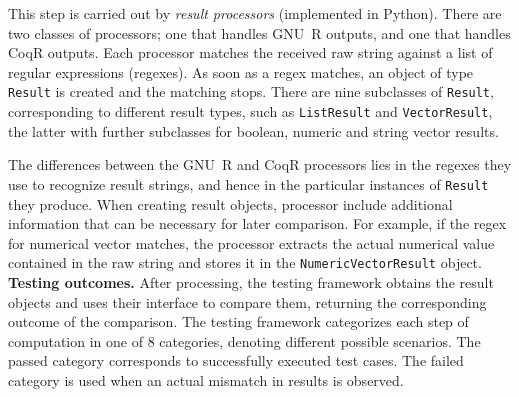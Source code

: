 \documentclass[
    sigplan,
    10pt,
    review, %
    natbib=false %
 ]{acmart}
\newcommand\CoqR{CoqR}
\newcommand\newtext[1]{{\color{blue} #1}}
\newcommand\changed[1]{{\color{blue} #1}}
\begin{document}
This step is carried out by {\em result processors} (implemented in Python). There are two classes of processors; one that handles GNU~R outputs, and one that handles CoqR outputs.  Each processor matches the received raw string against a list of regular expressions (regexes). As soon as a regex matches, an object of type \texttt{Result} is created and the matching stops. \newtext{There are nine subclasses of \texttt{Result}, corresponding to different result types, such as \texttt{ListResult} and \texttt{VectorResult}, the latter} with further subclasses for boolean, numeric and string vector results. 


 
The differences between the GNU~R and \CoqR{} processors lies in the regexes they use to recognize result strings, and hence in the particular instances of \texttt{Result} they produce.
%
When creating result objects, processor include additional information that can be necessary for later comparison. For example, if the regex for numerical vector matches, the processor extracts the actual numerical value contained in the raw string and stores it in the \texttt{NumericVectorResult} object. \\



\noindent\textbf{Testing outcomes.}
After processing, the testing framework obtains the result objects and uses their interface to compare them, returning the corresponding outcome of the comparison.
The testing framework categorizes each step of computation
in one of \changed{8 categories}, denoting different possible scenarios. The \textsf{passed} category corresponds to successfully executed test cases. The \textsf{failed} category is used when an actual mismatch in results is observed. 
\end{document}
